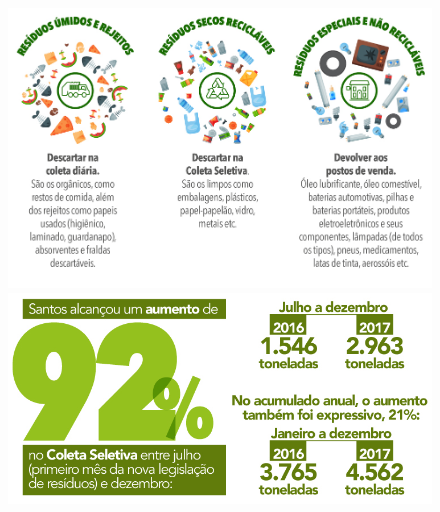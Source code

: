 \begin{figure}[htpb!]
\includegraphics[width=.5\textwidth]{media/image30.jpeg}
\includegraphics[width=.5\textwidth]{media/image31.jpeg}
\end{figure}

